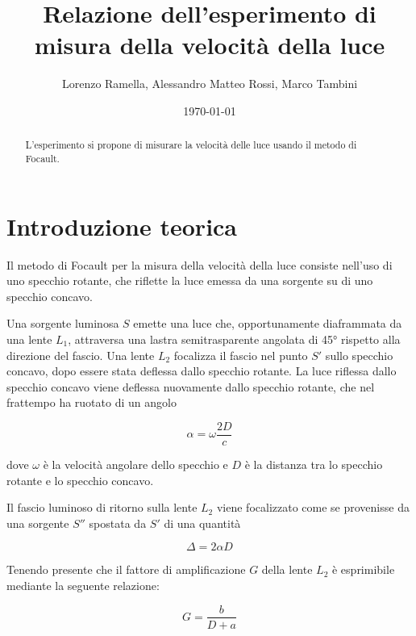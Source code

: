 \documentclass{article}
\title{Relazione dell'esperimento di misura della velocità della luce}
\author{Lorenzo Ramella, Alessandro Matteo Rossi, Marco Tambini}
\date{\today}
\begin{document}
\maketitle


\begin{abstract}
L’esperimento si propone di misurare la velocità delle luce usando il metodo di Focault. %
\end{abstract}


\tableofcontents
\newpage


\section{Introduzione teorica}
Il metodo di Focault per la misura della velocità della luce consiste nell'uso di uno specchio rotante, che riflette la luce emessa da una sorgente su di uno specchio 
concavo. 

Una sorgente luminosa $S$ emette una luce che, opportunamente diaframmata da una lente $L_1$, attraversa una lastra semitrasparente angolata di 45° rispetto alla 
direzione del fascio. Una lente $L_2$ focalizza il fascio nel punto $S'$ sullo specchio concavo, dopo essere stata deflessa dallo specchio rotante. La luce riflessa 
dallo specchio concavo viene deflessa nuovamente dallo specchio rotante, che nel frattempo ha ruotato di un angolo 

\begin{equation}
\alpha = \omega \frac{2D}{c}
\end{equation}

dove $\omega$ è la velocità angolare dello specchio e $D$ è la distanza tra lo specchio rotante e lo specchio concavo.

Il fascio luminoso di ritorno sulla lente $L_2$ viene focalizzato come se provenisse da una sorgente $S''$ spostata da $S'$ di una quantità 

\begin{equation}
\Delta = 2 \alpha D
\label{DELTA}
\end{equation}

Tenendo presente che il fattore di amplificazione $G$ della lente $L_2$ è esprimibile mediante la seguente relazione:

\begin{equation}
G=\frac{b}{D+a}
\label{G}
\end{equation}
\end{document}
